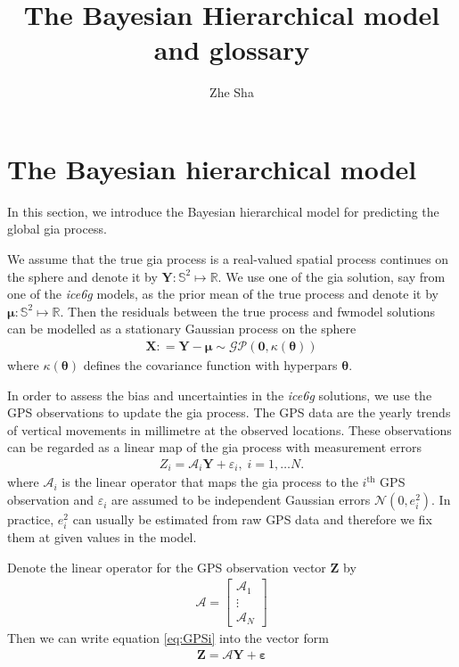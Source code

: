 \documentclass[a4paper,12pt]{article}
\begin{document}
 \title{The Bayesian Hierarchical model and glossary}
\author{Zhe Sha}
\maketitle

\onehalfspacing
{}
\section{The Bayesian hierarchical model}
In this section, we introduce the Bayesian hierarchical model for predicting the global \acrshort{gia} process. 

We assume that the true \acrshort{gia} process is a real-valued spatial process continues on the sphere and denote it by $\bm{Y}: \mathbb{S}^2 \mapsto \mathbb{R}$. We use one of the \acrshort{gia} solution, say from one of the \emph{ice6g} models, as the prior mean of the true process and denote it by $\bm{\mu}: \mathbb{S}^2 \mapsto \mathbb{R}$. Then the residuals between the true process and \gls{fwmodel} solutions can be modelled as a stationary Gaussian process on the sphere 
\begin{align}\label{eq:GIAresid}
 \bm{X}: = \bm{Y} - \bm{\mu} \sim \mathcal{GP}(\bm{0}, \kappa(\bm{\theta}))
\end{align}
where $\kappa(\bm{\theta})$ defines the covariance function with \gls{hyperpars} $\bm{\theta}$.

In order to assess the bias and uncertainties in the \emph{ice6g} solutions, we use the GPS observations to update the \acrshort{gia} process. The GPS  data are the yearly trends of vertical movements in millimetre at the observed locations. These observations can be regarded as a linear map of the \acrshort{gia} process with measurement errors
\begin{align}\label{eq:GPSi}
Z_i = \bm{\mathcal{A}}_i\bm{Y} + \varepsilon_i, \; i = 1,\dots N.
\end{align} 
where $\bm{\mathcal{A}}_i$ is the linear operator that maps the \acrshort{gia} process to the $i^{\mbox{th}}$ GPS observation and $\varepsilon_i$ are assumed to be independent Gaussian errors $\mathcal{N}(0, e_i^2)$. In practice, $e_i^2$ can usually be estimated from raw GPS data and therefore we fix them at given values in the model. 

Denote the linear operator for the GPS observation vector $\bm{Z}$ by 
\begin{align*}
\bm{\mathcal{A}} = \left[\begin{array}{c}
 \bm{\mathcal{A}}_1\\ \vdots \\ \bm{\mathcal{A}}_N \end{array} \right]
\end{align*}
Then we can write equation \ref{eq:GPSi} into the vector form
\begin{align}\label{eq:GPS}
\bm{Z} = \bm{\mathcal{A}}\bm{Y} + \bm{\varepsilon} 
\end{align}
\end{document}

